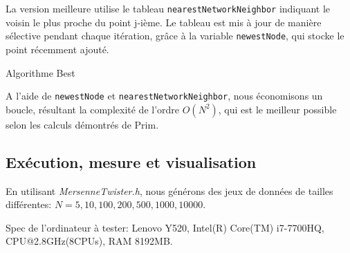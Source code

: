 \documentclass[10pt,a4paper]{article}
\begin{document}
La version meilleure utilise le tableau \texttt{nearestNetworkNeighbor} indiquant le voisin le plus proche du point j-ième. Le tableau est mis à jour de manière sélective pendant chaque itération, grâce à la variable \texttt{newestNode}, qui stocke le point récemment ajouté.

\begin{algorithm}[H]
    \caption{Algorithme Best}
\end{algorithm}

A l'aide de \texttt{newestNode} et \texttt{nearestNetworkNeighbor}, nous économisons un boucle, résultant la complexité de l'ordre $O(N^2)$, qui est le meilleur possible selon les calculs démontrés de Prim.

\subsection{Exécution, mesure et visualisation}

En utilisant \emph{MersenneTwister.h}, nous générons des jeux de données de tailles différentes: $N=5,10,100,200,500,1000,10000$.

Spec de l'ordinateur à tester: Lenovo Y520, Intel(R) Core(TM) i7-7700HQ, CPU@2.8GHz(8CPUs), RAM 8192MB.
\end{document}

